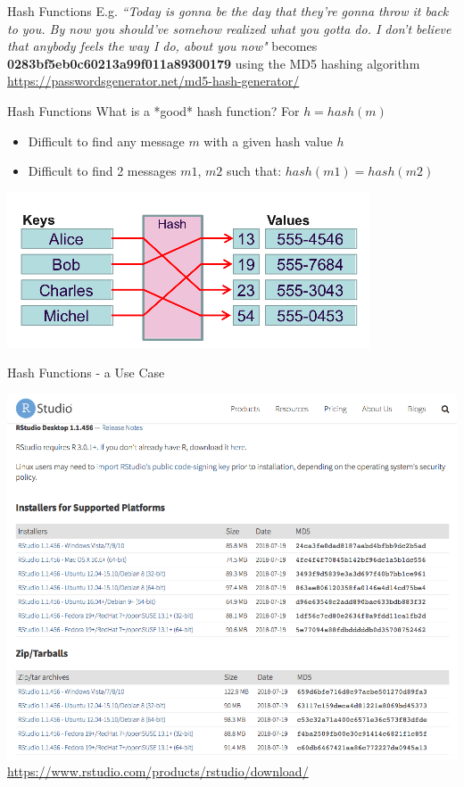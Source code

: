 \documentclass{beamer}
\begin{document}
\begin{frame}{Hash Functions}
E.g. \textit{``Today is gonna be the day that they're gonna throw it back to you. By now you should've somehow realized what you gotta do. I don't believe that anybody feels the way I do, about you now"} 
becomes \textbf{0283bf5eb0c60213a99f011a89300179} using the MD5 hashing algorithm
\newline
\url{https://passwordsgenerator.net/md5-hash-generator/}
\end{frame}

\begin{frame}{Hash Functions}
What is a *good* hash function? For \(h = hash(m)\)
\begin{itemize}
\item Difficult to find any message \(m\) with a given hash value \(h\)
\item Difficult to find 2 messages \(m1\), \(m2\) such that: \(hash(m1) = hash(m2)\)
\end{itemize}
\begin{center}
	\includegraphics[width=0.5\linewidth]{hash.png}
\end{center}
\end{frame}

\begin{frame}{{\color{red}Hash Functions - a Use Case}}
\begin{center}
	\includegraphics[width=0.65\linewidth]{r-studio.png}
    \newline
	{\footnotesize \url{https://www.rstudio.com/products/rstudio/download/} }
\end{center}
\end{frame}
\end{document}
